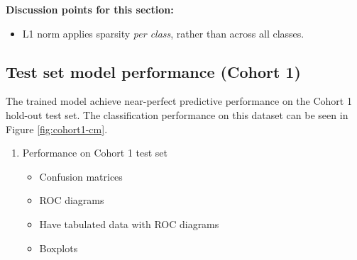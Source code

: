 \documentclass{article}
\begin{document}

\textbf{Discussion points for this section:}
\begin{itemize}
    \item L1 norm applies sparsity \textit{per class}, rather than across all classes.
\end{itemize}

\subsection{Test set model performance (Cohort 1)} \label{sec:cohort1-performance}
The trained model achieve near-perfect predictive performance on the Cohort 1 hold-out test set. The classification performance on this dataset can be seen in Figure \ref{fig:cohort1-cm}.

\begin{enumerate}
    \item Performance on Cohort 1 test set
          \begin{itemize}
              \item Confusion matrices
              \item ROC diagrams
              \item Have tabulated data with ROC diagrams
              \item Boxplots
          \end{itemize}
\end{enumerate}
\end{document}
